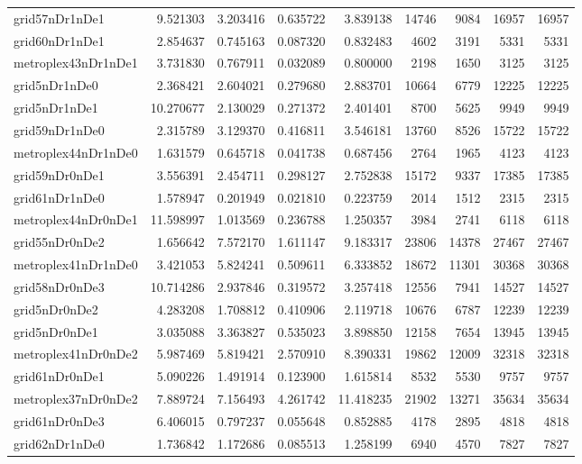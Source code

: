 \begin{longtable}{|l|r|r|r|r|r|r|r|r|}
grid57nDr1nDe1 & 9.521303 & 3.203416 & 0.635722 & 3.839138 & 14746 & 9084 & 16957 & 16957 \\
grid60nDr1nDe1 & 2.854637 & 0.745163 & 0.087320 & 0.832483 & 4602 & 3191 & 5331 & 5331 \\
metroplex43nDr1nDe1 & 3.731830 & 0.767911 & 0.032089 & 0.800000 & 2198 & 1650 & 3125 & 3125 \\
grid5nDr1nDe0 & 2.368421 & 2.604021 & 0.279680 & 2.883701 & 10664 & 6779 & 12225 & 12225 \\
grid5nDr1nDe1 & 10.270677 & 2.130029 & 0.271372 & 2.401401 & 8700 & 5625 & 9949 & 9949 \\
grid59nDr1nDe0 & 2.315789 & 3.129370 & 0.416811 & 3.546181 & 13760 & 8526 & 15722 & 15722 \\
metroplex44nDr1nDe0 & 1.631579 & 0.645718 & 0.041738 & 0.687456 & 2764 & 1965 & 4123 & 4123 \\
grid59nDr0nDe1 & 3.556391 & 2.454711 & 0.298127 & 2.752838 & 15172 & 9337 & 17385 & 17385 \\
grid61nDr1nDe0 & 1.578947 & 0.201949 & 0.021810 & 0.223759 & 2014 & 1512 & 2315 & 2315 \\
metroplex44nDr0nDe1 & 11.598997 & 1.013569 & 0.236788 & 1.250357 & 3984 & 2741 & 6118 & 6118 \\
grid55nDr0nDe2 & 1.656642 & 7.572170 & 1.611147 & 9.183317 & 23806 & 14378 & 27467 & 27467 \\
metroplex41nDr1nDe0 & 3.421053 & 5.824241 & 0.509611 & 6.333852 & 18672 & 11301 & 30368 & 30368 \\
grid58nDr0nDe3 & 10.714286 & 2.937846 & 0.319572 & 3.257418 & 12556 & 7941 & 14527 & 14527 \\
grid5nDr0nDe2 & 4.283208 & 1.708812 & 0.410906 & 2.119718 & 10676 & 6787 & 12239 & 12239 \\
grid5nDr0nDe1 & 3.035088 & 3.363827 & 0.535023 & 3.898850 & 12158 & 7654 & 13945 & 13945 \\
metroplex41nDr0nDe2 & 5.987469 & 5.819421 & 2.570910 & 8.390331 & 19862 & 12009 & 32318 & 32318 \\
grid61nDr0nDe1 & 5.090226 & 1.491914 & 0.123900 & 1.615814 & 8532 & 5530 & 9757 & 9757 \\
metroplex37nDr0nDe2 & 7.889724 & 7.156493 & 4.261742 & 11.418235 & 21902 & 13271 & 35634 & 35634 \\
grid61nDr0nDe3 & 6.406015 & 0.797237 & 0.055648 & 0.852885 & 4178 & 2895 & 4818 & 4818 \\
grid62nDr1nDe0 & 1.736842 & 1.172686 & 0.085513 & 1.258199 & 6940 & 4570 & 7827 & 7827 \\

\end{longtable}
